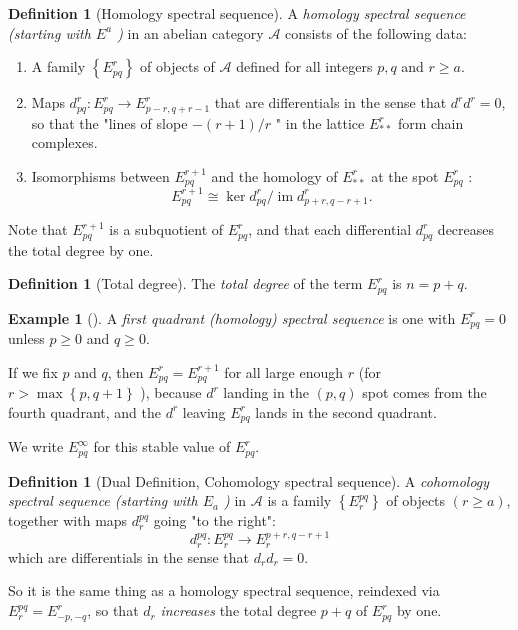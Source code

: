 \documentclass[reqno]{amsart}
\theoremstyle{definition}
\newtheorem{definition}[theorem]{Definition}
\newtheorem{example}[theorem]{Example}
\theoremstyle{remark}
\DeclareMathOperator{\im}{im}
\begin{document}
\begin{definition}[Homology spectral sequence]
    A \textit{homology spectral sequence (starting
    with $E^{a}$ )} in an abelian category
    $\mathcal{A}$ consists of the following data:
    \begin{enumerate}
        \item A family $\left\{ E_{pq}^{r} \right\} $ of
            objects of $\mathcal{A}$ defined for
            all integers $p,q$ and $r \ge a$.
        \item Maps $d_{pq}^{r} \colon
            E_{pq}^{r} \to E_{p-r,q+r-1}^{r}$ that
            are differentials in the sense that
            $d^{r} d^{r} = 0$, so that the "lines
            of slope $-(r+1) / r$ " in the lattice
            $E_{* *}^{r}$ form chain complexes.
        \item Isomorphisms between $E_{pq}^{r+1}$ and the
            homology of $E_{* *}^{r}$ at the spot
            $E_{pq}^{r}$ :
            \[
            E_{pq}^{r+1} \cong \ker d_{pq}^{r} /
            \im d_{p+r, q-r+1}^{r}.
            \] 
    \end{enumerate}
\end{definition}

Note that $E_{pq}^{r+1}$ is a subquotient of
$E_{pq}^{r}$, and that
each differential $d_{pq}^{r}$ decreases the
total degree by one.

\begin{definition}[Total degree]
    The \textit{total degree} of the term
    $E_{pq}^{r}$ is $n = p+q$.
\end{definition}

\begin{example}[]
    A \textit{first quadrant (homology) spectral sequence}
    is one with $E_{pq}^{r} = 0$ unless
    $p\ge 0$ and $q\ge 0$. 

    If we fix $p$ and $q$, then
    $E_{pq}^{r} = E_{pq}^{r+1}$ for all large
    enough $r$ (for $r> \max \left\{ p,q+1 \right\} $ ), because
    $d^{r}$ landing in the $(p,q)$ spot comes from the fourth
    quadrant, and the $d^{r}$ leaving $E_{pq}^{r}$ lands
    in the second quadrant.

    We write
    $E_{pq}^{\infty}$ for this
    stable value of $E_{pq}^{r}$.
\end{example}

\begin{definition}[Dual Definition, Cohomology spectral sequence]
    A \textit{cohomology spectral sequence (starting with
    $E_a$ )} in $\mathcal{A}$ is a family
    $\left\{ E_r^{pq} \right\} $ of objects $(r\ge a)$, together
    with maps $d_r^{pq}$ going "to the right":
    \[
    d_r^{pq} \colon E_{r}^{pq} \to E_{r}^{p+r,q-r+1}
    \] 
    which are differentials in the sense that
    $d_r d_r = 0$.

    So it is the same thing as a homology
    spectral sequence, reindexed via
    $E_r^{pq} = E_{-p,-q}^{r}$, so
    that $d_r$ \textit{increases} the total degree
    $p+q$ of $E_{pq}^{r}$ by one.
\end{definition}
\end{document}
